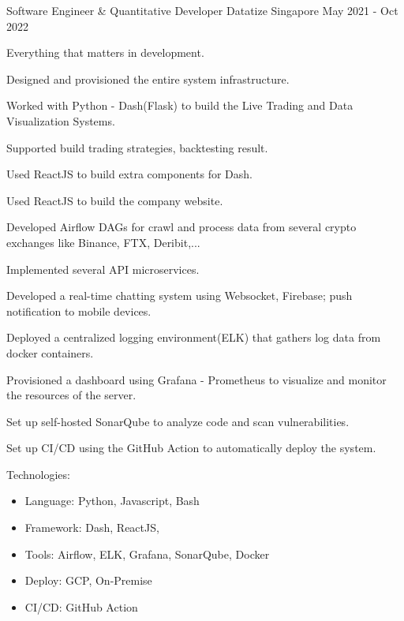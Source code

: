 \begin{cventries}
    
    \cventry
    {Software Engineer \& Quantitative Developer} %
    {Datatize} %
    {Singapore} %
    {May 2021 - Oct 2022} %
    {
      \begin{cvitems} %
        \item {Everything that matters in development.}
        \item {Designed and provisioned the entire system infrastructure.}
        \item {Worked with Python - Dash(Flask) to build the Live Trading and Data Visualization Systems.}
        \item {Supported build trading strategies, backtesting result.}
        \item {Used ReactJS to build extra components for Dash.}
        \item {Used ReactJS to build the company website.}
        \item {Developed Airflow DAGs for crawl and process data from several crypto exchanges like Binance, FTX, Deribit,...}
        \item {Implemented several API microservices.}
        \item {Developed a real-time chatting system using Websocket, Firebase; push notification to mobile devices.}
        \item {Deployed a centralized logging environment(ELK) that gathers log data from docker containers.}
        \item {Provisioned a dashboard using Grafana - Prometheus to visualize and monitor the resources of the server.}
        \item {Set up self-hosted SonarQube to analyze code and scan vulnerabilities.}
        \item {Set up CI/CD using the GitHub Action to automatically deploy the system.}
        \item {Technologies:
          \begin{itemize}
            \item {Language: Python, Javascript, Bash}
            \item {Framework: Dash, ReactJS, }
            \item {Tools: Airflow, ELK, Grafana, SonarQube, Docker}
            \item {Deploy: GCP, On-Premise}
            \item {CI/CD: GitHub Action}
          \end{itemize}
        }
      \end{cvitems}
    }


\end{cventries}
